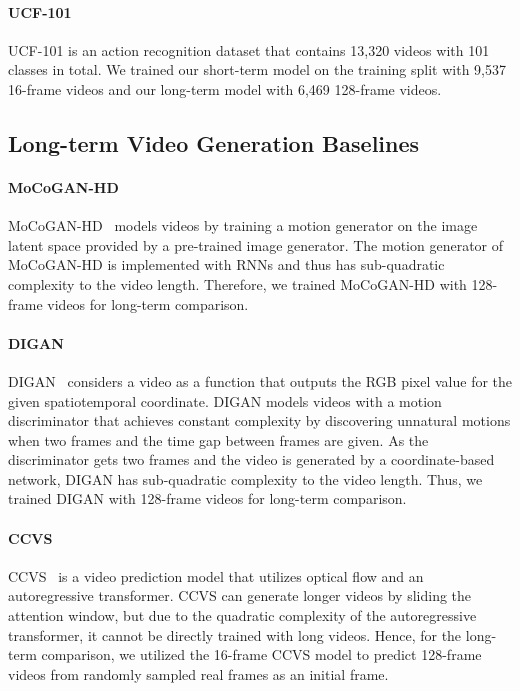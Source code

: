 \documentclass[10pt,twocolumn,letterpaper]{article}
\begin{document}
\paragraph{UCF-101} UCF-101 is an action recognition dataset that contains 13,320 videos with 101 classes in total. We trained our short-term model on the training split with 9,537 16-frame videos and our long-term model with 6,469 128-frame videos.

\subsection{Long-term Video Generation Baselines}
\label{appx:baselines}
\paragraph{MoCoGAN-HD} MoCoGAN-HD~\cite{MoCoGAN-HD} models videos by training a motion generator on the image latent space provided by a pre-trained image generator. The motion generator of MoCoGAN-HD is implemented with RNNs and thus has sub-quadratic complexity to the video length. Therefore, we trained MoCoGAN-HD with 128-frame videos for long-term comparison.

\paragraph{DIGAN}
DIGAN~\cite{DIGAN} considers a video as a function that outputs the RGB pixel value for the given spatiotemporal coordinate. DIGAN models videos with a motion discriminator that achieves constant complexity by discovering unnatural motions when two frames and the time gap between frames are given. As the discriminator gets two frames and the video is generated by a coordinate-based network, DIGAN has sub-quadratic complexity to the video length. Thus, we trained DIGAN with 128-frame videos for long-term comparison.

\paragraph{CCVS}
CCVS~\cite{CCVS} is a video prediction model that utilizes optical flow and an autoregressive transformer. CCVS can generate longer videos by sliding the attention window, but due to the quadratic complexity of the autoregressive transformer, it cannot be directly trained with long videos.
Hence, for the long-term comparison, we utilized the 16-frame CCVS model to predict 128-frame videos from randomly sampled real frames as an initial frame.
\end{document}
